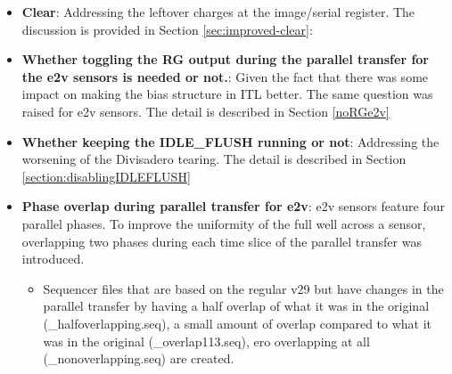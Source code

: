 \begin{itemize}
\item {\bf Clear}: Addressing the leftover charges at the image/serial register. The discussion is provided in Section \ref{sec:improved-clear}:
%
%  
\item {\bf Whether toggling the RG output during the parallel transfer for the e2v sensors is needed or not.}: Given the fact that there was some impact on making the bias structure in ITL better. The same question was raised for e2v sensors. The detail is described in Section \ref{noRGe2v}
\item {\bf Whether keeping the IDLE\_FLUSH running or not}: Addressing the worsening of the Divisadero tearing. The detail is described in Section \ref{section:disablingIDLEFLUSH}
\item {\bf Phase overlap during parallel transfer for e2v}: e2v sensors feature four parallel phases. To improve the uniformity of the full well across a sensor, overlapping two phases during each time slice of the parallel transfer was introduced.
\begin{itemize}
    \item Sequencer files that are based on the regular v29 but have changes in the parallel transfer by having a half overlap of what it was in the original (\_halfoverlapping.seq), a small amount of overlap compared to what it was in the original (\_overlap113.seq), ero overlapping at all (\_nonoverlapping.seq) are created.

\end{itemize}
\end{itemize}
